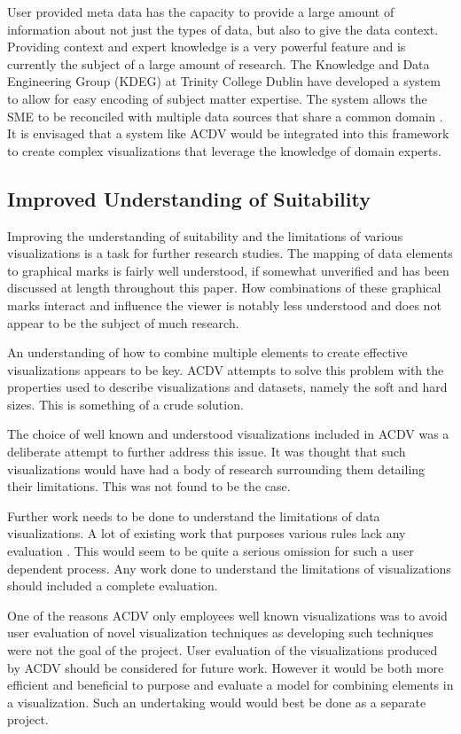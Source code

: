 \documentclass[a4paper, 11pt, titlepage, onehalfspacing]{report}
\begin{document}
User provided meta data has the capacity to provide a large amount of information about not just the types of data, but also to give the data context. Providing context and expert knowledge is a very powerful feature and is currently the subject of a large amount of research. The Knowledge and Data Engineering Group (KDEG) at Trinity College Dublin have developed a system to allow for easy encoding of subject matter expertise. The system allows the SME to be reconciled with multiple data sources that share a common domain \cite{champ}. It is envisaged that a system like AC\lightning{}DV would be integrated into this framework to create complex visualizations that leverage the knowledge of domain experts.

\subsection{Improved Understanding of Suitability}
Improving the understanding of suitability and the limitations of various visualizations is a task for further research studies. The mapping of data elements to graphical marks is fairly well understood, if somewhat unverified and has been discussed at length throughout this paper. How combinations of these graphical marks interact and influence the viewer is notably less understood and does not appear to be the subject of much research.

An understanding of how to combine multiple elements to create effective visualizations appears to be key. AC\lightning{}DV attempts to solve this problem with the properties used to describe visualizations and datasets, namely the soft and hard sizes. This is something of a crude solution.

The choice of well known and understood visualizations included in AC\lightning{}DV was a deliberate attempt to further address this issue. It was thought that such visualizations would have had a body of research surrounding them detailing their limitations. This was not found to be the case.

Further work needs to be done to understand the limitations of data visualizations. A lot of existing work that purposes various rules lack any evaluation \cite{card1999readings} \cite{mazza2009introduction}. This would seem to be quite a serious omission for such a user dependent process. Any work done to understand the limitations of visualizations should included a complete evaluation.

One of the reasons AC\lightning{}DV only employees well known visualizations was to avoid user evaluation of novel visualization techniques as developing such techniques were not the goal of the project. User evaluation of the visualizations produced by AC\lightning{}DV should be considered for future work. However it would be both more efficient and beneficial to purpose and evaluate a model for combining elements in a visualization. Such an undertaking would would best be done as a separate project.
\end{document}
